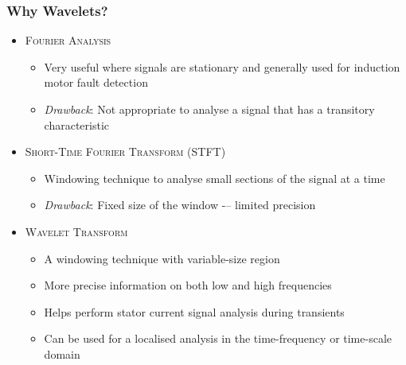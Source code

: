 \documentclass[9pt]{beamer}
\begin{document}
\begin{frame}
\frametitle{Why Wavelets?}


\begin{itemize} 
\item \textsc{Fourier Analysis}
    \begin{itemize}
    \item Very useful where signals are stationary and generally used for induction motor fault detection
    \item \emph{Drawback}: Not appropriate to analyse a signal that has a transitory characteristic
    \end{itemize}
\item \textsc{Short-Time Fourier Transform (STFT)} 
    \begin{itemize}
    \item Windowing technique to analyse small sections of the signal at a time
    \item \emph{Drawback}: Fixed size of the window -– limited precision
    \end{itemize}
\item \textsc{Wavelet Transform}
    \begin{itemize}
    \item A windowing technique with variable-size region
    \item More precise information on both low and high frequencies
    \item Helps perform stator current signal analysis during transients
    \item Can be used for a localised analysis in the time-frequency or time-scale domain
    \end{itemize}
\end{itemize}
\end{frame}
\end{document}
